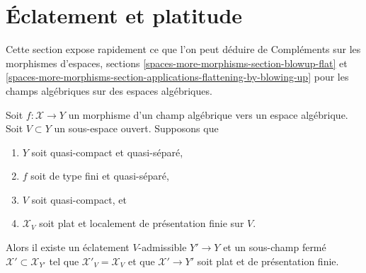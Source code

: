 \section{Éclatement et platitude}
\label{section-blowup-flat}

\noindent
Cette section expose rapidement ce que l'on peut déduire de
Compléments sur les morphismes d'espaces, sections
\ref{spaces-more-morphisms-section-blowup-flat} et
\ref{spaces-more-morphisms-section-applications-flattening-by-blowing-up}
pour les champs algébriques sur des espaces algébriques.

\begin{lemma}
\label{lemma-flatten-stack}
Soit $f : \mathcal{X} \to Y$ un morphisme d'un champ algébrique
vers un espace algébrique. Soit $V \subset Y$ un sous-espace ouvert. Supposons que
\begin{enumerate}
\item $Y$ soit quasi-compact et quasi-séparé,
\item $f$ soit de type fini et quasi-séparé,
\item $V$ soit quasi-compact, et
\item $\mathcal{X}_V$ soit plat et localement de présentation finie sur $V$.
\end{enumerate}
Alors il existe un éclatement $V$-admissible $Y' \to Y$
et un sous-champ fermé $\mathcal{X}' \subset \mathcal{X}_{Y'}$
tel que $\mathcal{X}'_V = \mathcal{X}_V$ et que
$\mathcal{X}' \to Y'$ soit plat et de présentation finie.
\end{lemma}

